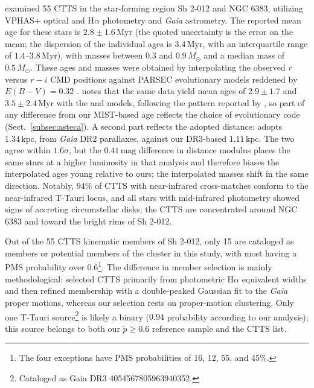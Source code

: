 \documentclass{aa}
\begin{document}
\citet{2019MNRAS.484.5102K} examined 55 CTTS in the star-forming region Sh 2-012 and NGC 6383, utilizing VPHAS+ optical and H$\alpha$ photometry and \textit{Gaia} astrometry. The reported mean age for these stars is $2.8 \pm 1.6\,\mathrm{Myr}$ (the quoted uncertainty is the error on the mean; the dispersion of the individual ages is $3.4\,\mathrm{Myr}$, with an interquartile range of $1.4$--$3.8\,\mathrm{Myr}$), with masses between $0.3$ and $0.9\,M_\odot$ and a median mass of $0.5\,M_\odot$. These ages and masses were obtained by interpolating the observed $r$ versus $r-i$ CMD positions against PARSEC evolutionary models reddened by $E(B-V)=0.32$ \citep{2012MNRAS.427..127B}\@. \citet{2019MNRAS.484.5102K} notes that the same data yield mean ages of $2.9\pm1.7$ and $3.5\pm2.4\,\mathrm{Myr}$ with the \citet{2011A&A...533A.109T} and \citet{2000A&A...358..593S} models, following the pattern reported by \citet{2015ApJ...808...23H}, so part of any difference from our MIST-based age reflects the choice of evolutionary code (Sect.~\ref{subsec:asteca}). A second part reflects the adopted distance: \citet{2019MNRAS.484.5102K} adopts $1.34\,\mathrm{kpc}$, from \textit{Gaia} DR2 parallaxes, against our DR3-based $1.11\,\mathrm{kpc}$. The two agree within $1.6\sigma$, but the $0.41\,\mathrm{mag}$ difference in distance modulus places the same stars at a higher luminosity in that analysis and therefore biases the interpolated ages young relative to ours; the interpolated masses shift in the same direction. Notably, $94\%$ of CTTS with near-infrared cross-matches conform to the near-infrared T-Tauri locus, and all stars with mid-infrared photometry showed signs of accreting circumstellar disks; the CTTS are concentrated around NGC 6383 and toward the bright rims of Sh 2-012.

Out of the 55 CTTS kinematic members of Sh 2-012, only 15 are cataloged as members or potential members of the cluster in this study, with most having a PMS probability over $0.6$\footnote{The four exceptions have PMS probabilities of 16, 12, 55, and 45\%.}. The difference in member selection is mainly methodological: \citet{2019MNRAS.484.5102K} selected CTTS primarily from photometric H$\alpha$ equivalent widths and then refined membership with a double-peaked Gaussian fit to the \textit{Gaia} proper motions, whereas our selection rests on proper-motion clustering. Only one T-Tauri source\footnote{Cataloged as Gaia DR3 4054567805963940352.} is likely a binary ($0.94$ probability according to our analysis); this source belongs to both our $\tilde{p}\geq0.6$ reference sample and the \citet{2019MNRAS.484.5102K} CTTS list.
\end{document}
